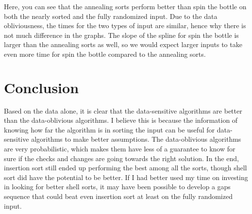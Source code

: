 \documentclass{article}
\begin{document}
    \noindent
    Here, you can see that the annealing sorts perform better than spin
    the bottle on both the nearly sorted and the fully randomized input. Due to
    the data obliviousness, the times for the two types of input are similar,
    hence why there is not much difference in the graphs. The slope of the
    spline for spin the bottle is larger than the annealing sorts as well, so we
    would expect larger inputs to take even more time for spin the bottle
    compared to the annealing sorts.

\section{Conclusion}
    Based on the data alone, it is clear that the data-sensitive algorithms are
    better than the data-oblivious algorithms. I believe this is because the
    information of knowing how far the algorithm is in sorting the input can
    be useful for data-sensitive algorithms to make better assumptions. The 
    data-oblivious algorithms are very probabilistic, which makes them have less
    of a guarantee to know for sure if the checks and changes are going towards
    the right solution.
    \nextblurb
    In the end, insertion sort still ended up performing the best among all the
    sorts, though shell sort did have the potential to be better. If I had
    better used my time on investing in looking for better shell sorts, it may
    have been possible to develop a gaps sequence that could beat even insertion
    sort at least on the fully randomized input.
\end{document}
